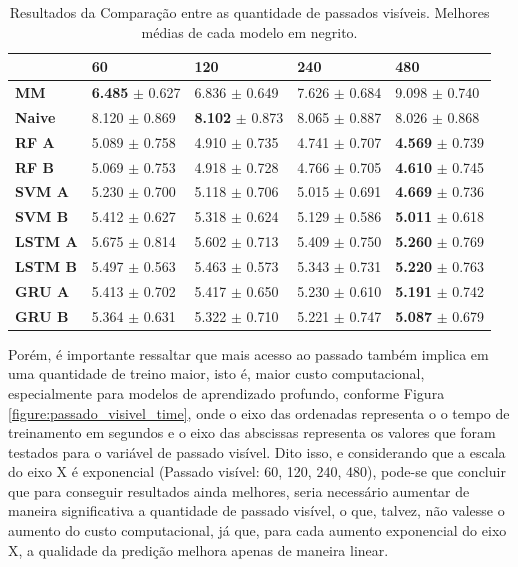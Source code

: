 \begin{table}[htbp]
    \begin{tabular*}{\linewidth}{@{\extracolsep{\fill}}lllll}
    \toprule
     & 
    \multicolumn{1}{l}{\textbf{60}} & 
    \multicolumn{1}{l}{\textbf{120}} &
    \multicolumn{1}{l}{\textbf{240}} &
    \multicolumn{1}{l}{\textbf{480}} \\
    \midrule
    \textbf{MM} & \textbf{6.485} $\pm$ 0.627 & 6.836 $\pm$ 0.649 & 7.626 $\pm$ 0.684 & 9.098 $\pm$ 0.740
    \\
    \midrule
    \textbf{Naive} & 8.120 $\pm$ 0.869 & \textbf{8.102} $\pm$ 0.873 & 8.065 $\pm$ 0.887 & 8.026 $\pm$ 0.868 
    \\
    \midrule
    \textbf{RF A} & 5.089 $\pm$ 0.758 & 4.910 $\pm$ 0.735 & 4.741 $\pm$ 0.707 & \textbf{4.569} $\pm$ 0.739 
    \\
    \midrule
    \textbf{RF B} & 5.069 $\pm$ 0.753 & 4.918 $\pm$ 0.728 & 4.766 $\pm$ 0.705 & \textbf{4.610} $\pm$ 0.745 
    \\
    \midrule
    \textbf{SVM A} & 5.230 $\pm$ 0.700 & 5.118 $\pm$ 0.706 & 5.015 $\pm$ 0.691 & \textbf{4.669} $\pm$ 0.736 
    \\
    \midrule
    \textbf{SVM B} & 5.412 $\pm$ 0.627 & 5.318 $\pm$ 0.624 & 5.129 $\pm$ 0.586 & \textbf{5.011} $\pm$ 0.618 
    \\
    \midrule
    \textbf{LSTM A} & 5.675 $\pm$ 0.814 & 5.602 $\pm$ 0.713 & 5.409 $\pm$ 0.750 & \textbf{5.260} $\pm$ 0.769 
    \\
    \midrule
    \textbf{LSTM B} & 5.497 $\pm$ 0.563 & 5.463 $\pm$ 0.573 & 5.343 $\pm$ 0.731 & \textbf{5.220} $\pm$ 0.763 
    \\
    \midrule
    \textbf{GRU A} & 5.413 $\pm$ 0.702 & 5.417 $\pm$ 0.650 & 5.230 $\pm$ 0.610 & \textbf{5.191} $\pm$ 0.742 
    \\
    \midrule
    \textbf{GRU B} & 5.364 $\pm$ 0.631 & 5.322 $\pm$ 0.710 & 5.221 $\pm$ 0.747 & \textbf{5.087} $\pm$ 0.679
    \\
    \bottomrule
    \end{tabular*}
    \label{table:res_past}
    \caption{Resultados da Comparação entre as quantidade de passados visíveis. Melhores médias de cada modelo em negrito.}
\end{table}
 

Porém, é importante ressaltar que mais acesso ao passado também implica em uma quantidade de treino maior, isto é, maior custo computacional, especialmente para modelos de aprendizado profundo, conforme  Figura \ref{figure:passado_visivel_time}, onde o eixo das ordenadas representa o o tempo de treinamento em segundos e o eixo das abscissas representa os valores que foram testados para o variável de passado visível. Dito isso, e considerando que a escala do eixo X é exponencial (Passado visível: 60, 120, 240, 480), pode-se que concluir que para conseguir resultados ainda melhores, seria necessário aumentar de maneira significativa a quantidade de passado visível, o que, talvez, não valesse o aumento do custo computacional, já que, para cada aumento exponencial do eixo X, a qualidade da predição melhora apenas de maneira linear. 

